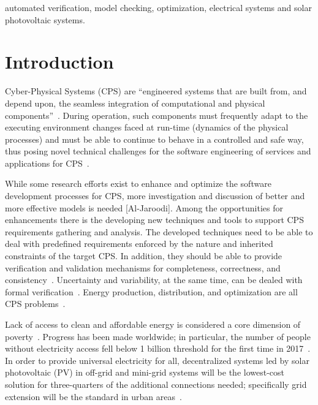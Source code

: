 \documentclass[10pt,conference]{IEEEtran}
\begin{document}
\begin{IEEEkeywords}
automated verification, model checking, optimization, electrical systems and solar photovoltaic systems.
\end{IEEEkeywords}


\section{Introduction}
Cyber-Physical  Systems  (CPS)  are  “engineered systems  that  are built from, and depend upon, the seamless integration of computational  and  physical  components”~\cite{NSF2015}. During operation, such components must frequently adapt to the executing environment changes faced at run-time (dynamics of the physical processes) and must be able to continue to behave in a controlled and safe way, thus posing novel technical challenges for the software engineering of services and applications for CPS~\cite{Metzger2014}. %

While some research efforts exist to enhance and optimize the software development processes for CPS, more investigation and discussion of better and more effective models is needed [Al-Jaroodi]. Among the opportunities for enhancements there is the developing new techniques and tools to support CPS requirements gathering and analysis. The developed techniques need to be able to deal with predefined requirements enforced by the nature and inherited constraints of the target CPS. In addition, they should be able to provide verification and validation mechanisms for completeness, correctness, and consistency~\cite{Al-Jaroodi2016}. Uncertainty and variability, at the same time, can be dealed with formal verification~\cite{NESSI}. Energy production, distribution, and optimization are all CPS problems~\cite{UC}. 

Lack of access to clean and affordable energy is considered a core dimension of poverty~\cite{Hussein2012}. Progress has been made worldwide; in particular, the number of people without electricity access fell below 1 billion threshold for the first time in 2017~\cite{IEAweo2018}. In order to provide universal electricity for all, decentralized systems led by solar photovoltaic (PV) in off-grid and mini-grid systems will be the lowest-cost solution for three-quarters of the additional connections needed; specifically grid extension will be the standard in urban areas~\cite{IEAweo2018}.
\end{document}
